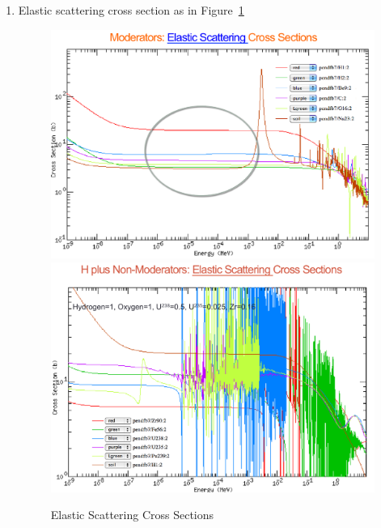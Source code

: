 \documentclass{school-22.211-notes}
\begin{document}
\begin{enumerate}
\item Elastic scattering cross section as in Figure~\ref{scatter-xs}
\begin{figure}
  \centering
  \includegraphics[width=6in]{images/intro/scatter-xs-moderator.png}
  \\
  \includegraphics[width=6in]{images/intro/scatter-xs-LWR.png}
  \caption{Elastic Scattering Cross Sections} \label{scatter-xs}
\end{figure}


\end{enumerate}
\end{document}
